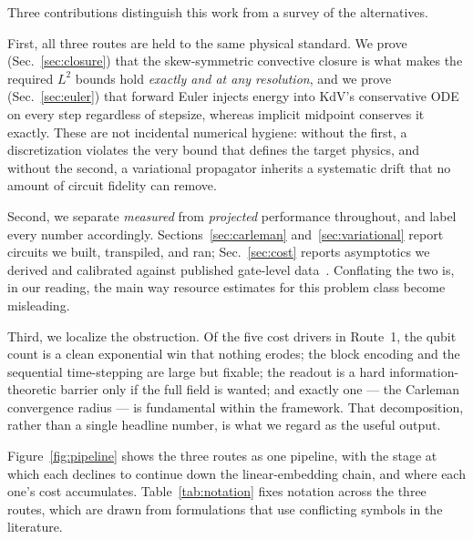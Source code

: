 \documentclass[aps,prx,twocolumn,notitlepage,superscriptaddress,floatfix,10pt]{revtex4-2}
\begin{document}
\noindent
Three contributions distinguish this work from a survey of the alternatives.

First, all three routes are held to the same physical standard. We prove
(Sec.~\ref{sec:closure}) that the skew-symmetric convective closure is what makes the required $L^2$
bounds hold \emph{exactly and at any resolution}, and we prove (Sec.~\ref{sec:euler}) that forward
Euler injects energy into KdV's conservative ODE on every step regardless of stepsize, whereas
implicit midpoint conserves it exactly. These are not incidental numerical hygiene: without the first,
a discretization violates the very bound that defines the target physics, and without the second, a
variational propagator inherits a systematic drift that no amount of circuit fidelity can remove.

Second, we separate \emph{measured} from \emph{projected} performance throughout, and label every
number accordingly. Sections~\ref{sec:carleman} and~\ref{sec:variational} report circuits we built,
transpiled, and ran; Sec.~\ref{sec:cost} reports asymptotics we derived and calibrated against
published gate-level data~\cite{Setty2026}. Conflating the two is, in our reading, the main way
resource estimates for this problem class become misleading.

Third, we localize the obstruction. Of the five cost drivers in Route~1, the qubit count is a clean
exponential win that nothing erodes; the block encoding and the sequential time-stepping are large but
fixable; the readout is a hard information-theoretic barrier only if the full field is wanted; and
exactly one --- the Carleman convergence radius --- is fundamental within the framework. That
decomposition, rather than a single headline number, is what we regard as the useful output.

Figure~\ref{fig:pipeline} shows the three routes as one pipeline, with the stage at which each
declines to continue down the linear-embedding chain, and where each one's cost accumulates.
Table~\ref{tab:notation} fixes notation across the three routes, which are drawn from formulations
that use conflicting symbols in the literature.
\end{document}
